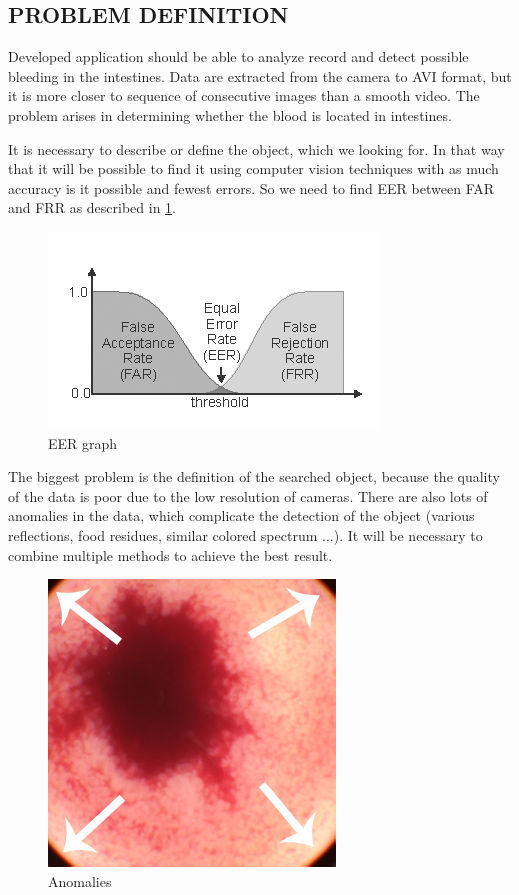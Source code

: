 \documentclass[twoside]{article}
\begin{document}
\begin{multicols}{2}

\section{PROBLEM DEFINITION}
Developed application should be able to analyze record and detect possible bleeding in the intestines. Data are extracted from the camera to AVI format, but it is more closer to sequence of consecutive images than a smooth video. The problem arises in determining whether the blood is located in intestines.

It is necessary to describe or define the object, which we looking for. In that way that it will be possible to find it using computer vision techniques with as much accuracy is it possible and fewest errors. So we need to find EER between FAR and FRR as described in \ref{fig:eergraf}.

\begin{figure}[H]
	\includegraphics[scale=0.5]{eergraf}
	\centering
	\caption{EER graph \cite{gumption:}\label{fig:eergraf}}
\end{figure}

The biggest problem is the definition of the searched object, because the quality of the data is poor due to the low resolution  of cameras. There are also lots of anomalies in the data, which complicate the detection of the object (various reflections, food residues, similar colored spectrum ...). It will be necessary to combine multiple methods to achieve the best result.

\begin{figure}[H]
	\includegraphics[scale=0.5]{anomalie}
	\centering
	\caption{Anomalies \label{fig:anomalie}}
\end{figure} 


\end{multicols}
\end{document}
